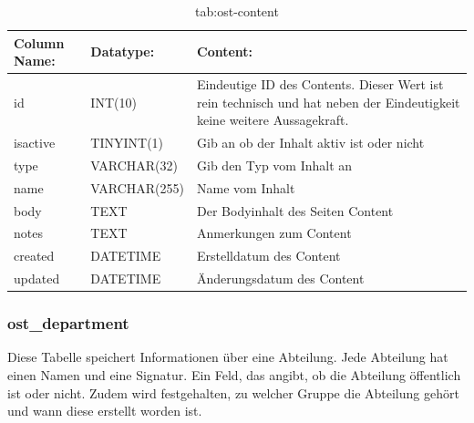 \begin{table}[h]
	\begin{tabular}{|p{3.5cm}|p{4cm}|p{6.2cm}|}
		\hline
		\textbf{Column Name:} & \textbf{Datatype:} & \textbf{Content:}\\
		\hline
		id & INT(10) & Eindeutige ID des Contents. Dieser Wert ist rein technisch und hat neben der Eindeutigkeit keine weitere 
		Aussagekraft.\\
		\hline
		isactive & TINYINT(1) & Gib an ob der Inhalt aktiv ist oder nicht\\
		\hline
		type & VARCHAR(32) & Gib den Typ vom Inhalt an\\
		\hline
		name & VARCHAR(255) & Name vom Inhalt\\
		\hline
		body & TEXT & Der Bodyinhalt des Seiten Content\\
		\hline
		notes & TEXT & Anmerkungen zum Content\\
		\hline
		created & DATETIME & Erstelldatum des Content\\
		\hline
		updated & DATETIME & Änderungsdatum des Content\\
		\hline
	\end{tabular}
	\caption{tab:ost-content}
\end{table}
\label{tab:ost_content}

\newpage

\subsubsection{ost\_department}

Diese Tabelle speichert Informationen über eine Abteilung. Jede Abteilung hat einen Namen und eine Signatur. Ein Feld, das angibt, ob die Abteilung öffentlich ist oder nicht. Zudem wird festgehalten, zu welcher Gruppe die Abteilung gehört und wann diese erstellt worden ist.

